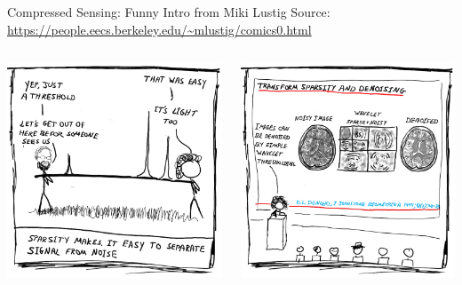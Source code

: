 \documentclass[aspectratio=169]{beamer}
\begin{document}
	\begin{frame}{Compressed Sensing: Funny Intro from Miki Lustig}
		Source: \url{https://people.eecs.berkeley.edu/~mlustig/comics0.html}
		\vspace{1em}
		\begin{columns}
			\centering
			\includegraphics[width=\columnwidth]{figures/cs-lustig-comics-11.png}
			
			\centering
			\includegraphics[width=\columnwidth]{figures/cs-lustig-comics-12.png}
		\end{columns}
	\end{frame}
	
\end{document}
